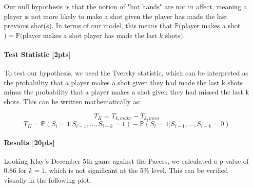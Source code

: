 \documentclass[11pt]{article}
\begin{document}
    Our null hypothesis is that the notion of "hot hands" are not in affect,
meaning a player is not more likely to make a shot given the player has
made the last previous shot(s). In terms of our model, this means that
\(\mathbb{P}(\)player makes a shot\() = \mathbb{P}(\)player makes a shot
\textbar{} player has made the last \(k\) shots\()\).

    \paragraph{Test Statistic {[}2pts{]}}\label{test-statistic-2pts}

    To test our hypothesis, we used the Tversky statistic, which can be
interpreted as the probability that a player makes a shot given they had
made the last k shots minus the probability that a player makes a shot
given they had missed the last k shots. This can be written
mathematically as:

\[T_K = T_{k,make} - T_{k,miss}\]
\[T_K = \mathbb{P}(S_i=1 | S_{i-1}, ..., S_{i-k} = 1) - \mathbb{P}(S_i=1 | S_{i-1}, ..., S_{i-k} = 0)\]

    \paragraph{Results {[}20pts{]}}\label{results-20pts}

    Looking Klay's December 5th game against the Pacers, we calculated a
p-value of 0.86 for \(k=1\), which is not significant at the 5\% level.
This can be verified visually in the following plot.
\end{document}
